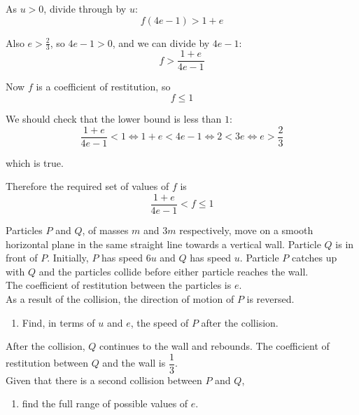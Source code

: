 \documentclass[leqno]{article}
\begin{document}
\begin{enumerate}[
  label=\textbf{\arabic*.},
  leftmargin=*,
  topsep=0pt,
  partopsep=0pt,
  parsep=0pt
]
\begin{djsSolution}
\begin{enumerate}[label=\textbf{(\alph*)}]
As $u>0$, divide through by $u$:
\[
f(4e-1)>1+e
\]

Also $e>\frac23$, so $4e-1>0$, and we can divide by $4e-1$:
\[
f>\frac{1+e}{4e-1}
\]

Now $f$ is a coefficient of restitution, so
\[
f\le 1
\]

We should check that the lower bound is less than $1$:
\[
\frac{1+e}{4e-1}<1
\iff 1+e<4e-1
\iff 2<3e
\iff e>\frac23
\]

which is true.

Therefore the required set of values of $f$ is
\[
\frac{1+e}{4e-1}<f\le 1
\]

\end{enumerate}
\end{djsSolution}


\newpage

\questionitem

Particles $P$ and $Q$, of masses $m$ and $3m$ respectively, move on a smooth horizontal plane in the same straight line towards a vertical wall. Particle $Q$ is in front of $P$. Initially, $P$ has speed $6u$ and $Q$ has speed $u$. Particle $P$ catches up with $Q$ and the particles collide before either particle reaches the wall. \\

The coefficient of restitution between the particles is $e$. \\

As a result of the collision, the direction of motion of $P$ is reversed. \\

\begin{enumerate}[label=\textbf{(\alph*)}]
  \item Find, in terms of $u$ and $e$, the speed of $P$ after the collision.  \\
\end{enumerate}
After the collision, $Q$ continues to the wall and rebounds. The coefficient of restitution between $Q$ and the wall is $\dfrac{1}{3}$. \\

Given that there is a second collision between $P$ and $Q$, \\

\begin{enumerate}[label=\textbf{(\alph*)}, resume]
  \item find the full range of possible values of $e$.  \\
\end{enumerate}


\end{enumerate}
\end{document}
